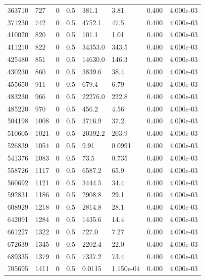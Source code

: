 \documentclass[preview]{standalone}
\begin{document}
{{\begin{tabular}{L{1.2cm}C{1.2cm} C{0.3cm}C{0.5cm} C{1.4cm}C{1.4cm} C{1.4cm}C{1.4cm}}
  363710  &   727  & 0     & 0.5 &  381.1  & 3.81  & 0.400 &  4.000e-03   \\ 
  371230  &   742  & 0     & 0.5 &  4752.1  & 47.5  & 0.400 &  4.000e-03   \\ 
  410020  &   820  & 0     & 0.5 &  101.1  & 1.01  & 0.400 &  4.000e-03   \\ 
  411210  &   822  & 0     & 0.5 &  34353.0  & 343.5  & 0.400 &  4.000e-03   \\ 
  425480  &   851  & 0     & 0.5 &  14630.0  & 146.3  & 0.400 &  4.000e-03   \\ 
  430230  &   860  & 0     & 0.5 &  3839.6  & 38.4  & 0.400 &  4.000e-03   \\ 
  455650  &   911  & 0     & 0.5 &  679.4  & 6.79  & 0.400 &  4.000e-03   \\ 
  483230  &   966  & 0     & 0.5 &  22276.0  & 222.8  & 0.400 &  4.000e-03   \\ 
  485220  &   970  & 0     & 0.5 &  456.2  & 4.56  & 0.400 &  4.000e-03   \\ 
  504198  &  1008  & 0     & 0.5 &  3716.9  & 37.2  & 0.400 &  4.000e-03   \\ 
  510605  &  1021  & 0     & 0.5 &  20392.2  & 203.9  & 0.400 &  4.000e-03   \\ 
  526839  &  1054  & 0     & 0.5 &  9.91  & 0.0991  & 0.400 &  4.000e-03   \\ 
  541376  &  1083  & 0     & 0.5 &  73.5  & 0.735  & 0.400 &  4.000e-03   \\ 
  558726  &  1117  & 0     & 0.5 &  6587.2  & 65.9  & 0.400 &  4.000e-03   \\ 
  560692  &  1121  & 0     & 0.5 &  3444.5  & 34.4  & 0.400 &  4.000e-03   \\ 
  592831  &  1186  & 0     & 0.5 &  2908.8  & 29.1  & 0.400 &  4.000e-03   \\ 
  608929  &  1218  & 0     & 0.5 &  2814.8  & 28.1  & 0.400 &  4.000e-03   \\ 
  642091  &  1284  & 0     & 0.5 &  1435.6  & 14.4  & 0.400 &  4.000e-03   \\ 
  661227  &  1322  & 0     & 0.5 &  727.0  & 7.27  & 0.400 &  4.000e-03   \\ 
  672639  &  1345  & 0     & 0.5 &  2202.4  & 22.0  & 0.400 &  4.000e-03   \\ 
  689335  &  1379  & 0     & 0.5 &  7337.2  & 73.4  & 0.400 &  4.000e-03   \\ 
  705695  &  1411  & 0     & 0.5 &  0.0115  & 1.150e-04  & 0.400 &  4.000e-03   \\ 

\end{tabular}}}
\end{document}
